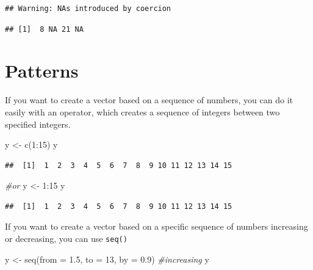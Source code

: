\documentclass[
]{book}
\newenvironment{Shaded}{\begin{snugshade}}{\end{snugshade}}
\newcommand{\AttributeTok}[1]{\textcolor[rgb]{0.77,0.63,0.00}{#1}}
\newcommand{\CommentTok}[1]{\textcolor[rgb]{0.56,0.35,0.01}{\textit{#1}}}
\newcommand{\DecValTok}[1]{\textcolor[rgb]{0.00,0.00,0.81}{#1}}
\newcommand{\FloatTok}[1]{\textcolor[rgb]{0.00,0.00,0.81}{#1}}
\newcommand{\FunctionTok}[1]{\textcolor[rgb]{0.00,0.00,0.00}{#1}}
\newcommand{\NormalTok}[1]{#1}
\newcommand{\OtherTok}[1]{\textcolor[rgb]{0.56,0.35,0.01}{#1}}
\newcommand{\SpecialCharTok}[1]{\textcolor[rgb]{0.00,0.00,0.00}{#1}}
\theoremstyle{definition}
\theoremstyle{definition}
\theoremstyle{definition}
\theoremstyle{definition}
\theoremstyle{remark}
\begin{document}
\begin{verbatim}
## Warning: NAs introduced by coercion
\end{verbatim}

\begin{verbatim}
## [1]  8 NA 21 NA
\end{verbatim}

\hypertarget{patterns}{%
\section{Patterns}\label{patterns}}

If you want to create a vector based on a sequence of numbers, you can do it easily with an operator, which creates a sequence of integers between two specified integers.

\begin{Shaded}
\begin{Highlighting}[]
\NormalTok{y }\OtherTok{\textless{}{-}} \FunctionTok{c}\NormalTok{(}\DecValTok{1}\SpecialCharTok{:}\DecValTok{15}\NormalTok{)}
\NormalTok{y}
\end{Highlighting}
\end{Shaded}

\begin{verbatim}
##  [1]  1  2  3  4  5  6  7  8  9 10 11 12 13 14 15
\end{verbatim}

\begin{Shaded}
\begin{Highlighting}[]
\CommentTok{\#or}
\NormalTok{y }\OtherTok{\textless{}{-}} \DecValTok{1}\SpecialCharTok{:}\DecValTok{15}
\NormalTok{y}
\end{Highlighting}
\end{Shaded}

\begin{verbatim}
##  [1]  1  2  3  4  5  6  7  8  9 10 11 12 13 14 15
\end{verbatim}

If you want to create a vector based on a specific sequence of numbers increasing or decreasing, you can use \texttt{seq()}

\begin{Shaded}
\begin{Highlighting}[]
\NormalTok{y }\OtherTok{\textless{}{-}} \FunctionTok{seq}\NormalTok{(}\AttributeTok{from =} \FloatTok{1.5}\NormalTok{, }\AttributeTok{to =} \DecValTok{13}\NormalTok{, }\AttributeTok{by =} \FloatTok{0.9}\NormalTok{) }\CommentTok{\#increasing}
\NormalTok{y}
\end{Highlighting}
\end{Shaded}
\end{document}
